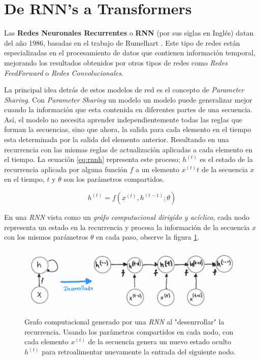 \section{De RNN's a Transformers}

Las \textbf{Redes Neuronales Recurrentes} o \textbf{RNN} (por sus siglas en Inglés) datan del año
1986, basadas en el trabajo de Rumelhart \cite{Rumelhart}. Este tipo de redes están especializadas
en el procesamiento de datos que contienen información temporal, mejorando los resultados obtenidos
por otros tipos de redes como \textit{Redes FeedForward} o \textit{Redes Convolucionales}.

La principal idea detrás de estos modelos de red es el concepto de \textit{Parameter Sharing}.
Con \textit{Parameter Sharing} un modelo un modelo puede generalizar mejor cuando la información
que esta contenida en diferentes partes de una secuencia. Así, el modelo no necesita aprender
independientemente todas las reglas que forman la secuencias, sino que ahora, la salida para cada
elemento en el tiempo esta determinada por la salida del elemento anterior. Resultando en una
recurrencia con las mismas reglas de actualización aplicadas a cada elemento en el tiempo.
La ecuación \ref{eq:rnnh} representa este proceso; $h^{(t)}$ es el estado de la recurrencia aplicada
por alguna función $f$ a un elemento $x^{(t)}t$ de la secuencia $x$ en el tiempo, $t$ y $\theta$ son
los parámetros compartidos.

\begin{equation}
    h^{(t)} = f(x^{(t)}, h^{(t-1)}; \theta)
    \label{eq:rnnh}
\end{equation}

En una \textit{RNN} vista como un \textit{gráfo computacional dirigído y acíclico}, cada nodo
representa un estado en la recurrencia y procesa la información de la secuencia $x$ con los mismos
parámetros $\theta$ en cada paso, observe la figura \ref{fig:rnn_cg}.

\begin{figure}[!ht]
\centering
\includegraphics[width=.8\textwidth]{Chapters/1. Transformer/Figures/rnn/rnn_cgraph.png}
\caption[RNN - Grafo Computacional]{Grafo computacional generado por una \textit{RNN} al "desenrrollar" la
recurrencia. Usando los parámetros compartidos en cada nodo, con cada elemento $x^{(t)}$ de la
secuencia genera un nuevo estado oculto $h^{(t)}$ para retroalimentar nuevamente la entrada del
siguiente nodo.}
\label{fig:rnn_cg}
\end{figure}

